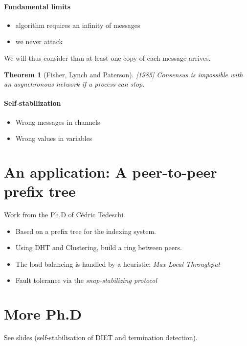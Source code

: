 \documentclass{article}
\newtheorem{thm}{Theorem}
\begin{document}
\paragraph{Fundamental limits}
\begin{itemize}[noitemsep]
\item algorithm requires an infinity of messages
\item we never attack
\end{itemize}

We will thus consider than at least one copy of each message arrives.

\begin{thm}[Fisher, Lynch and Paterson][1985]
	Consensus is impossible with an asynchronous network if a process can stop.
\end{thm}



\paragraph{Self-stabilization}
\begin{itemize}[noitemsep]
\item Wrong messages in channels
\item Wrong values in variables
\end{itemize}



\section{An application: A peer-to-peer prefix tree}
Work from the Ph.D of Cédric Tedeschi.

\begin{itemize}
\item Based on a prefix tree for the indexing system.
\item Using DHT and Clustering, build a ring between peers.
\item The load balancing is handled by a heuristic: \emph{Max Local Throughput}
\item Fault tolerance via the \emph{snap-stabilizing protocol}
\end{itemize}

\section{More Ph.D}
See slides (self-stabilisation of DIET and termination detection).
\end{document}
